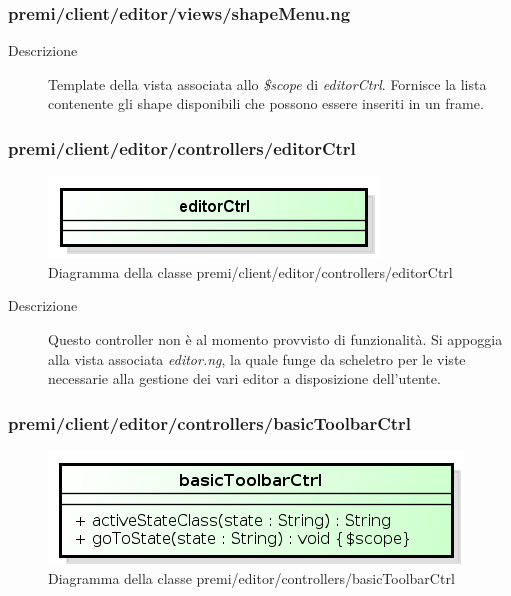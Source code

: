 \subsubsection{premi/client/editor/views/shapeMenu.ng}

\begin{description}
\item[Descrizione] \hfill
	Template della vista associata allo \textit{\$scope} di \textit{editorCtrl}. Fornisce la lista contenente gli shape disponibili che possono essere inseriti in un frame.
\end{description}


\subsubsection{premi/client/editor/controllers/editorCtrl}
\begin{figure}[H]
\begin{center}
\includegraphics[scale=0.80]{img/diacla/editorCtrl.png}
\caption{Diagramma della classe premi/client/editor/controllers/editorCtrl}
\end{center}
\end{figure}

\begin{description}
\item[Descrizione] \hfill
	Questo controller non è al momento provvisto di funzionalità. Si appoggia alla vista associata \textit{editor.ng}, la quale funge da scheletro per le viste necessarie alla gestione dei vari editor a disposizione dell'utente. 
\end{description}

\subsubsection{premi/client/editor/controllers/basicToolbarCtrl}
\begin{figure}[H]
\begin{center}
\includegraphics[scale=0.85]{img/diacla/basicToolbarCtrl.png}
\caption{Diagramma della classe premi/editor/controllers/basicToolbarCtrl}
\end{center}
\end{figure}


